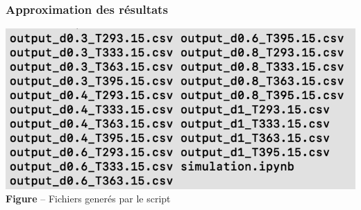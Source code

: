 \documentclass{beamer}
\begin{document}
\begin{frame}
\frametitle{Approximation des résultats}
\centering
\begin{minipage}{0.48\textwidth}
    \centering
    \includegraphics[width=\linewidth]{Fig/stefan-fichiers.png}
    \textbf{Figure} -- Fichiers generés par le script
\end{minipage}
\hfill
\begin{minipage}{0.48\textwidth}
    \centering
        

\end{minipage}
\end{frame}
\end{document}
